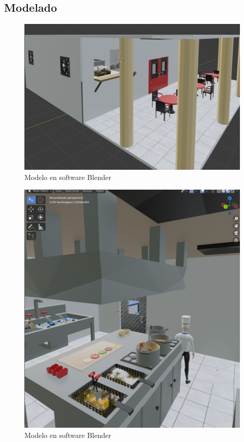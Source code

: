 \documentclass[letter,12pt]{article}
\begin{document}
\subsection{Modelado}
\begin{figure}[H]
		\includegraphics[scale=0.5]{img/img1}
		\centering
		\caption{Modelo en software Blender}
	\end{figure}
\begin{figure}[H]
		\includegraphics[scale=0.5]{img/img2}
		\centering
		\caption{Modelo en software Blender}
	\end{figure}
\end{document}
